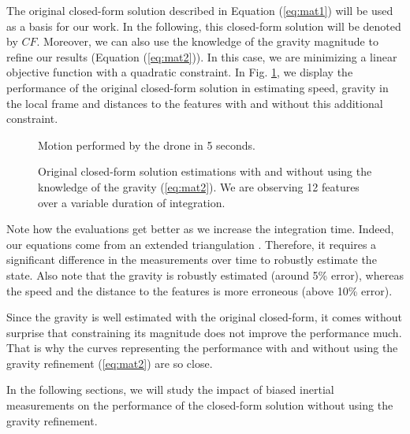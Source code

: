 \documentclass[letterpaper, 10 pt, conference]{ieeeconf}  %
\begin{document}
The original closed-form solution described in Equation (\ref{eq:mat1}) will be used as a basis for our work. In the following, this closed-form solution will be denoted by $CF$.
Moreover, we can also use the knowledge of the gravity magnitude to refine our results (Equation (\ref{eq:mat2})).
In this case, we are minimizing a linear objective function with a quadratic constraint.
In Fig. \ref{fig:original}, we display the performance of the  original closed-form solution in estimating speed, gravity in the local frame and distances to the features with and without this additional constraint.


\begin{figure}
  \centering
    \resizebox{0.5\columnwidth}{!}{}
    \caption{Motion performed by the drone in 5 seconds.}
\end{figure}

\begin{figure}
  \centering
    \resizebox{0.7\columnwidth}{!}{}
    \caption{Original closed-form solution estimations with and without using the knowledge of the gravity (\ref{eq:mat2}). We are observing 12 features  over a variable duration of integration.\label{fig:original}}
\end{figure}


Note how the evaluations get better as we increase the integration time.
Indeed, our equations come from an extended triangulation \cite{Martinelli2012}.
Therefore, it requires a significant difference in the measurements over time to robustly estimate the state.
Also note that the gravity is robustly estimated (around 5\% error), whereas the speed and the distance to the features is more erroneous (above 10\% error).

Since the gravity is well estimated with the original closed-form, it comes without surprise that constraining its magnitude does not improve the performance much.
That is why the curves representing the performance with and without using the gravity refinement (\ref{eq:mat2}) are so close.

In the following sections, we will study the impact of biased inertial measurements on the performance of the closed-form solution without using the gravity refinement.
\end{document}
